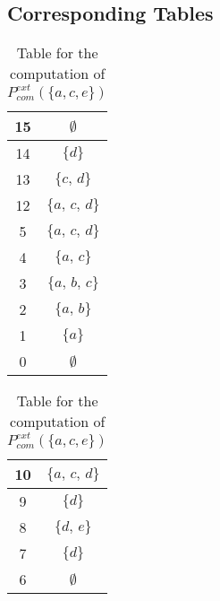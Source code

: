 \documentclass{article}
\begin{document}
\subsection*{Corresponding Tables}

\begin{table}[h]
\centering
\begin{tabular}{c c}
\hline
15 & $\emptyset$ \\
\hline
14 & $\{d\}$ \\
\hline
13 & $\{c,\,d\}$ \\
\hline
12 & $\{a,\,c,\,d\}$ \\
\hline
5 & $\{a,\,c,\,d\}$ \\
\hline
4 & $\{a,\,c\}$ \\
\hline
3 & $\{a,\,b,\,c\}$ \\
\hline
2 & $\{a,\,b\}$ \\
\hline
1 & $\{a\}$ \\
\hline
0 & $\emptyset$ \\
\hline
\end{tabular}
\caption{Table for the computation of \(P^{\mathit{ext}}_{com}(\{a, c, e\})\)}
\label{tab:table1}
\end{table}

\begin{table}[h]
\centering
\begin{tabular}{c c}
\hline
10 & $\{a,\,c,\,d\}$ \\
\hline
9 & $\{d\}$ \\
\hline
8 & $\{d,\,e\}$ \\
\hline
7 & $\{d\}$ \\
\hline
6 & $\emptyset$ \\
\hline
\end{tabular}
\caption{Table for the computation of \(P^{\mathit{ext}}_{com}(\{a, c, e\})\)}
\label{tab:table2}
\end{table}
\end{document}
